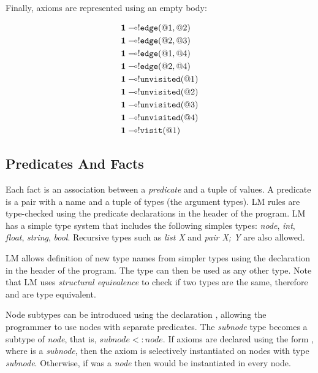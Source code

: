 Finally, axioms are represented using an empty body:

\nopagebreak

\begin{align}
\mathbf{1} \multimap & {!} \mathtt{edge}(@1, @2) \\
\mathbf{1} \multimap & {!} \mathtt{edge}(@2, @3) \\
\mathbf{1} \multimap & {!} \mathtt{edge}(@1, @4) \\
\mathbf{1} \multimap & {!} \mathtt{edge}(@2, @4) \\
\mathbf{1} \multimap & {!} \mathtt{unvisited}(@1)  \\
\mathbf{1} \multimap & {!} \mathtt{unvisited}(@2) \\
\mathbf{1} \multimap & {!} \mathtt{unvisited}(@3) \\
\mathbf{1} \multimap & {!} \mathtt{unvisited}(@4) \\
\mathbf{1} \multimap & {!} \mathtt{visit}(@1)
\end{align}

\subsection{Predicates And Facts}

Each fact is an association between a \emph{predicate} and a tuple of values. A
predicate is a pair with a name and a tuple of types (the argument types). LM
rules are type-checked using the predicate declarations in the header of the
program. LM has a simple type system that includes the following simples types:
\emph{node}, \emph{int}, \emph{float}, \emph{string}, \emph{bool}. Recursive
types such as \emph{list X} and \emph{pair X; Y} are also allowed.

LM allows definition of new type names from simpler types using the declaration
 in the header of the program. The type
 can then be used as any other type. Note that LM uses
\emph{structural equivalence} to check if two types are the same, therefore
 and  are type equivalent.

Node subtypes can be introduced using the declaration ,
allowing the programmer to use nodes with separate predicates.  The
\emph{subnode} type becomes a subtype of \emph{node}, that is, $subnode <:
node$. If axioms are declared using the form , where  is a
\emph{subnode}, then the axiom is selectively instantiated on nodes with type
\emph{subnode}. Otherwise, if  was a \emph{node} then  would
be instantiated in every node.


